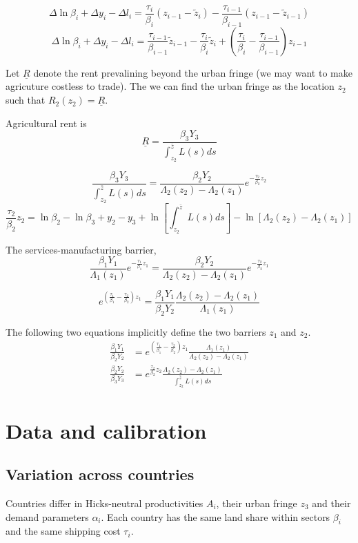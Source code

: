 \documentclass[12pt]{article}
\begin{document}
\[
\Delta\ln\beta_i + \Delta y_i - \Delta l_i =
\frac{\tau_i}{\beta_i}(z_{i-1} -\tilde z_i)
-\frac{\tau_{i-1}}{\beta_{i-1}}(z_{i-1}-\tilde z_{i-1})
\]
\[
\Delta\ln\beta_i + \Delta y_i - \Delta l_i =
\frac{\tau_{i-1}}{\beta_{i-1}}\tilde z_{i-1}
-\frac{\tau_i}{\beta_i}\tilde z_i
+\left(\frac{\tau_{i}}{\beta_{i}}-\frac{\tau_{i-1}}{\beta_{i-1}}\right)z_{i-1}
\]



Let $\underline R$ denote the rent prevalining beyond the urban fringe (we may want to make agricuture costless to trade). The we can find the urban fringe as the location $z_2$ such that $R_2(z_2)=\underline R$.

Agricultural rent is
\[
\underline R = \frac{\beta_3 Y_3}{\int_{z_2}^{\bar z}L(s)ds} 
\]

\[
 \frac{\beta_3 Y_3}{\int_{z_2}^{\bar z}L(s)ds} =
 \frac{\beta_2 Y_2}{\Lambda_2(z_2)-\Lambda_2(z_1)} e^{-\frac{\tau_{2}}{\beta_{2}} z_2}
\]
\[
\frac{\tau_2}{\beta_2}z_2 =
\ln\beta_2-\ln\beta_3 +y_2-y_3+\ln\left[\int_{z_2}^{\bar z}L(s)ds\right]
-\ln[\Lambda_2(z_2)-\Lambda_2(z_1)]
\]

The services-manufacturing barrier,
\[
 \frac{\beta_1 Y_1}{\Lambda_1(z_1)} e^{-\frac{\tau_{1}}{\beta_{1}} z_1} =
 \frac{\beta_2 Y_2}{\Lambda_2(z_2)-\Lambda_2(z_1)} e^{-\frac{\tau_{2}}{\beta_{2}} z_1}
\]

\[
e^{\left(\frac{\tau_{1}}{\beta_{1}}-\frac{\tau_{2}}{\beta_{2}}\right) z_1}
= 
 \frac{\beta_1 Y_1}{\beta_2 Y_2}  
 \frac{\Lambda_2(z_2)-\Lambda_2(z_1)}{\Lambda_1(z_1)} 
\]

The following two equations implicitly define the two barriers $z_1$ and $z_2$.
\begin{align}
 \frac{\beta_1 Y_1}{\beta_2 Y_2}  
 &=
 e^{\left(\frac{\tau_{1}}{\beta_{1}}-\frac{\tau_{2}}{\beta_{2}}\right) z_1}
 \frac{\Lambda_1(z_1)}{\Lambda_2(z_2)-\Lambda_2(z_1)} 
\\
 \frac{\beta_2 Y_2}  {\beta_3 Y_3}
 &=
 e^{\frac{\tau_{2}}{\beta_{2}} z_2}
 \frac{\Lambda_2(z_2)-\Lambda_2(z_1)} {\int_{z_2}^{\bar z}L(s)ds}
\end{align}


\section{Data and calibration}

\subsection{Variation across countries}
Countries differ in Hicks-neutral productivities $A_i$, their urban fringe $z_3$ and their demand parameters $\alpha_i$. Each country has the same land share within sectors $\beta_i$ and the same shipping cost $\tau_i$.
\end{document}
